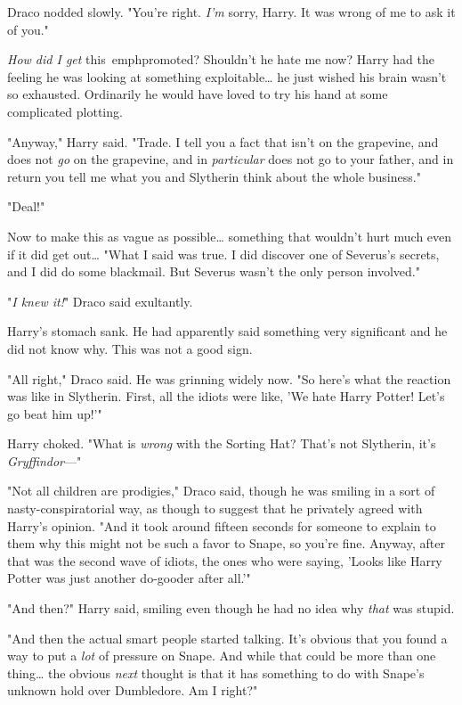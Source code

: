 Draco nodded slowly. "You're right. \emph{I'm} sorry, Harry. It was wrong of me 
to ask it of you."

\emph{How did I get} this\ emph{promoted? Shouldn't he hate me now?} Harry had 
the feeling he was looking at something exploitable{\ldots} he just wished his 
brain wasn't so exhausted. Ordinarily he would have loved to try his hand at 
some complicated plotting.

"Anyway," Harry said. "Trade. I tell you a fact that isn't on the grapevine, 
and does not \emph{go} on the grapevine, and in \emph{particular} does not go 
to your father, and in return you tell me what you and Slytherin think about 
the whole business."

"Deal!"

Now to make this as vague as possible{\ldots} something that wouldn't hurt much 
even if it did get out{\ldots} "What I said was true. I did discover one of 
Severus's secrets, and I did do some blackmail. But Severus wasn't the only 
person involved."

"\emph{I knew it!}" Draco said exultantly.

Harry's stomach sank. He had apparently said something very significant and he 
did not know why. This was not a good sign.

"All right," Draco said. He was grinning widely now. "So here's what the 
reaction was like in Slytherin. First, all the idiots were like, 'We hate Harry 
Potter! Let's go beat him up!'"

Harry choked. "What is \emph{wrong} with the Sorting Hat? That's not Slytherin, 
it's \emph{Gryffindor}---"

"Not all children are prodigies," Draco said, though he was smiling in a sort 
of nasty-conspiratorial way, as though to suggest that he privately agreed with 
Harry's opinion. "And it took around fifteen seconds for someone to explain to 
them why this might not be such a favor to Snape, so you're fine. Anyway, after 
that was the second wave of idiots, the ones who were saying, 'Looks like Harry 
Potter was just another do-gooder after all.'"

"And then?" Harry said, smiling even though he had no idea why \emph{that} was 
stupid.

"And then the actual smart people started talking. It's obvious that you found 
a way to put a \emph{lot} of pressure on Snape. And while that could be more 
than one thing{\ldots} the obvious \emph{next} thought is that it has something 
to do with Snape's unknown hold over Dumbledore. Am I right?"

